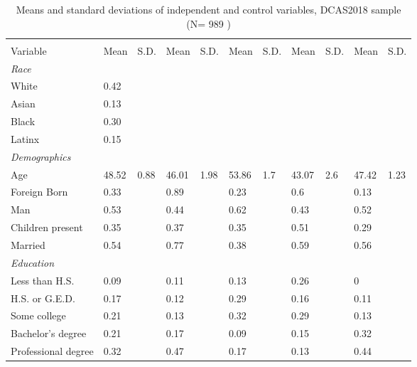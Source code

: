 % 
\begin{sidewaystable}[ht]
\centering
\caption{Means and standard deviations of independent and control variables, DCAS2018 sample  (N= 989 )} 
\label{tab:descriptives18}
\begin{tabular}{lR{.4in}R{.4in}R{.4in}R{.4in}R{.4in}R{.4in}R{.4in}R{.4in}R{.4in}R{.4in}}
  \toprule
&  &  &  &  &  \\
Variable & Mean & S.D. & Mean & S.D. & Mean & S.D. & Mean & S.D. & Mean & S.D. \\ 
  \midrule
\emph{Race}&&\\White &  0.42 &  &  &  &  &  &  &  &  &  \\ 
  Asian &  0.13 &  &  &  &  &  &  &  &  &  \\ 
  Black &  0.30 &  &  &  &  &  &  &  &  &  \\ 
  Latinx\vspace{1em} &  0.15 &  &  &  &  &  &  &  &  &  \\ 
  \emph{Demographics}&&\\Age & 48.52 & 0.88 & 46.01 & 1.98 & 53.86 & 1.7 & 43.07 & 2.6 & 47.42 & 1.23 \\ 
  Foreign Born &  0.33 &  & 0.89 &  & 0.23 &  & 0.6 &  & 0.13 &  \\ 
  Man &  0.53 &  & 0.44 &  & 0.62 &  & 0.43 &  & 0.52 &  \\ 
  Children present &  0.35 &  & 0.37 &  & 0.35 &  & 0.51 &  & 0.29 &  \\ 
  Married\vspace{1em} &  0.54 &  & 0.77 &  & 0.38 &  & 0.59 &  & 0.56 &  \\ 
  \emph{Education}&&\\Less than H.S. &  0.09 &  & 0.11 &  & 0.13 &  & 0.26 &  & 0 &  \\ 
  H.S. or G.E.D. &  0.17 &  & 0.12 &  & 0.29 &  & 0.16 &  & 0.11 &  \\ 
  Some college &  0.21 &  & 0.13 &  & 0.32 &  & 0.29 &  & 0.13 &  \\ 
  Bachelor's degree &  0.21 &  & 0.17 &  & 0.09 &  & 0.15 &  & 0.32 &  \\ 
  Professional degree\vspace{1em} &  0.32 &  & 0.47 &  & 0.17 &  & 0.13 &  & 0.44 &  \\ 

\end{tabular}
\end{sidewaystable}
